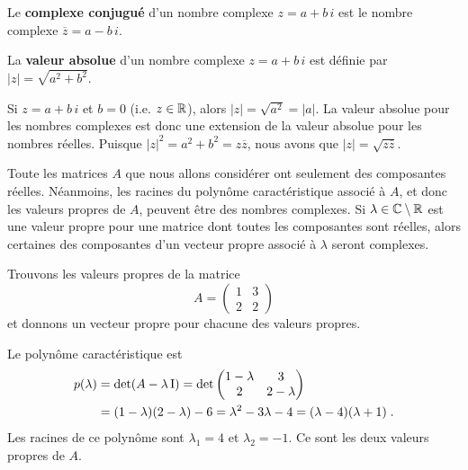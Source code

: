 {\begin{defn}
Le {\bfseries complexe conjugué} d'un
nombre complexe $z=a+b\,i$ est le nombre complexe
$\overline{z} = a - b\, i$.
\end{defn}

\begin{defn}
La {\bfseries valeur absolue}
d'un nombre complexe $z=a+b\,i$ est définie par
$|z| = \sqrt{a^2+b^2}$.
\end{defn}

Si $z = a + b \, i$ et $b=0$ (i.e. $z \in \mathbb{R}$), alors
$|z| = \sqrt{a^2} = |a|$.  La valeur absolue pour les nombres
complexes est donc une extension de la valeur absolue pour les nombres
réelles.  Puisque $|z|^2 = a^2 + b^2 = z\overline{z}$,
nous avons que $|z| = \sqrt{z\overline{z}}$.

\begin{rmk}
Toute les matrices $A$ que nous allons considérer ont seulement des
composantes réelles.  Néanmoins, les racines du polynôme
caractéristique associé à $A$, et donc les valeurs propres de $A$,
peuvent être des nombres complexes.  Si $\lambda \in \mathbb{C}\setminus \mathbb{R}$
est une valeur propre pour une matrice dont toutes les composantes
sont réelles, alors certaines des composantes d'un vecteur propre
associé à $\lambda$ seront complexes.
\end{rmk}

\begin{egg}
Trouvons les valeurs propres de la matrice
\[
A = \begin{pmatrix} 1 & 3 \\ 2 & 2 \end{pmatrix}
\]
et donnons un vecteur propre pour chacune des valeurs propres.

Le polynôme caractéristique est 
\begin{align*}
p(\lambda) &= \det(A - \lambda \operatorname{I}) = \det
\begin{pmatrix}
1-\lambda & 3 \\ 2 & 2-\lambda  
\end{pmatrix} \\
&= (1-\lambda)(2-\lambda) - 6 = \lambda^2 -3 \lambda - 4
= (\lambda - 4)(\lambda +1) \; .
\end{align*}
Les racines de ce polynôme sont $\lambda_1 = 4$ et $\lambda_2 = -1$.
Ce sont les deux valeurs propres de $A$.


\end{egg}}
